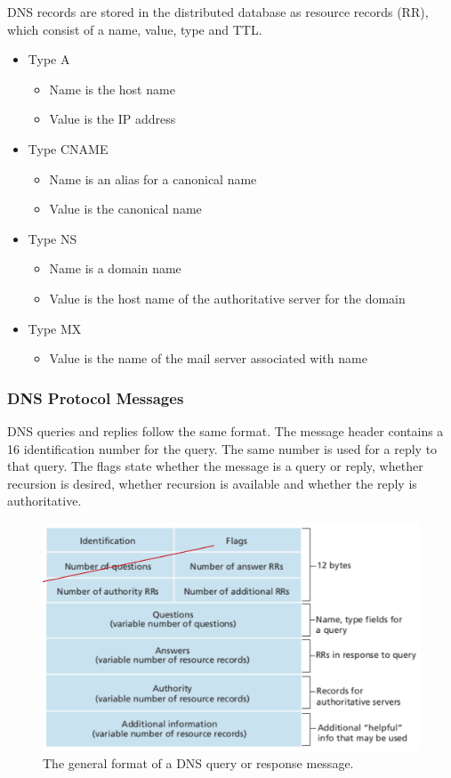 DNS records are stored in the distributed database as resource records (RR), which consist of a name, value, type and TTL.
\begin{itemize}
  \item Type A
  \begin{itemize}
    \item Name is the host name
    \item Value is the IP address
  \end{itemize}
  \item Type CNAME
  \begin{itemize}
    \item Name is an alias for a canonical name
    \item Value is the canonical name
  \end{itemize}
  \item Type NS
  \begin{itemize}
    \item Name is a domain name
    \item Value is the host name of the authoritative server for the domain
  \end{itemize}
  \item Type MX
  \begin{itemize}
    \item Value is the name of the mail server associated with name
  \end{itemize}
\end{itemize}

\subsubsection{DNS Protocol Messages}

DNS queries and replies follow the same format.
The message header contains a \SI{16}{\bit} identification number for the query.
The same number is used for a reply to that query.
The flags state whether the message is a query or reply, whether recursion is desired, whether recursion is available and whether the reply is authoritative.

\begin{figure}[htp]
  \centering
  \includegraphics[width=12cm]{unit-17/figures/dns-message.png}
  \caption*{The general format of a DNS query or response message.}
\end{figure}

